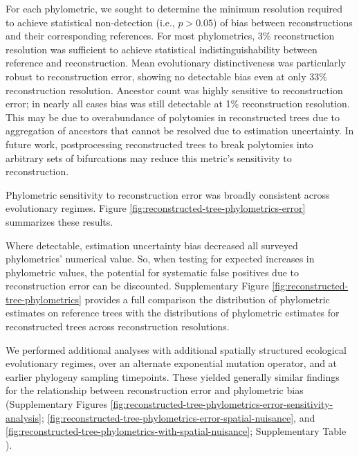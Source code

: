 For each phylometric, we sought to determine the minimum resolution required to achieve statistical non-detection (i.e., $p > 0.05$) of bias between reconstructions and their corresponding references.
For most phylometrics, 3\% reconstruction resolution was sufficient to achieve statistical indistinguishability between reference and reconstruction.
Mean evolutionary distinctiveness was particularly robust to reconstruction error, showing no detectable bias even at only 33\% reconstruction resolution.
Ancestor count was highly sensitive to reconstruction error; in nearly all cases bias was still detectable at 1\% reconstruction resolution.
This may be due to overabundance of polytomies in reconstructed trees due to aggregation of ancestors that cannot be resolved due to estimation uncertainty.
In future work, postprocessing reconstructed trees to break polytomies into arbitrary sets of bifurcations may reduce this metric's sensitivity to reconstruction.

Phylometric sensitivity to reconstruction error was broadly consistent across evolutionary regimes.
Figure \ref{fig:reconstructed-tree-phylometrics-error} summarizes these results.

Where detectable, estimation uncertainty bias decreased all surveyed phylometrics' numerical value.
So, when testing for expected increases in phylometric values, the potential for systematic false positives due to reconstruction error can be discounted.
Supplementary Figure \ref{fig:reconstructed-tree-phylometrics} provides a full comparison the distribution of phylometric estimates on reference trees with the distributions of phylometric estimates for reconstructed trees across reconstruction resolutions.

We performed additional analyses with additional spatially structured ecological evolutionary regimes, over an alternate exponential mutation operator, and at earlier phylogeny sampling timepoints.
These yielded generally similar findings for the relationship between reconstruction error and phylometric bias (Supplementary Figures \ref{fig:reconstructed-tree-phylometrics-error-sensitivity-analysis}; \ref{fig:reconstructed-tree-phylometrics-error-spatial-nuisance}, and \ref{fig:reconstructed-tree-phylometrics-with-spatial-nuisance}; Supplementary Table ).
